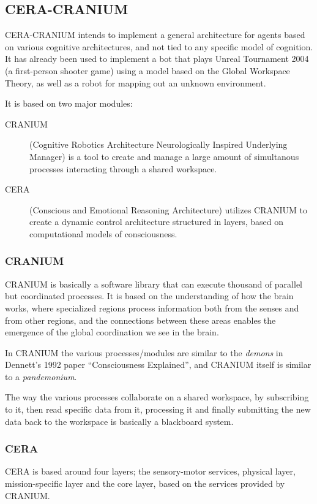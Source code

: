 \subsection{CERA-CRANIUM}
CERA-CRANIUM intends to implement a general architecture for agents based on
various cognitive architectures, and not tied to any specific model of
cognition. It has already been used to implement a bot that plays Unreal
Tournament 2004 (a first-person shooter game) using a model based on the Global
Workspace Theory, as well as a robot for mapping out an unknown environment.
\cite{arrabales2009ceracranium}

It is based on two major modules:
\begin{description}
 \item [CRANIUM] (Cognitive Robotics Architecture Neurologically Inspired
Underlying Manager) is a tool to create and manage a large amount of
simultanous processes interacting through a shared workspace.
 \item [CERA] (Conscious and Emotional Reasoning Architecture)
 utilizes CRANIUM to create a dynamic control architecture structured in
layers, based on computational models of consciousness.
\end{description}

\subsubsection{CRANIUM}
CRANIUM is basically a software library that can execute thousand of parallel
but coordinated processes.
It is based on the understanding of how the brain works, where specialized
regions process information both from the senses and from other regions, and
the connections between these areas enables the emergence of the global
coordination we see in the brain.\cite{baars2005gwd}

In CRANIUM the various processes/modules are similar to the \textit{demons} in
Dennett's 1992 paper ``Consciousness Explained'', and CRANIUM itself is similar
to a \textit{pandemonium}\cite{dennet1992consciousness}.

The way the various processes collaborate on a shared workspace, by subscribing
to it, then read specific data from it, processing it and finally submitting the
new data back to the workspace is basically a blackboard
system.\cite{nii1986blackboard}

\subsubsection{CERA}
CERA is based around four layers; the sensory-motor services, physical layer,
mission-specific layer and the core layer, based on the services provided by
CRANIUM.

